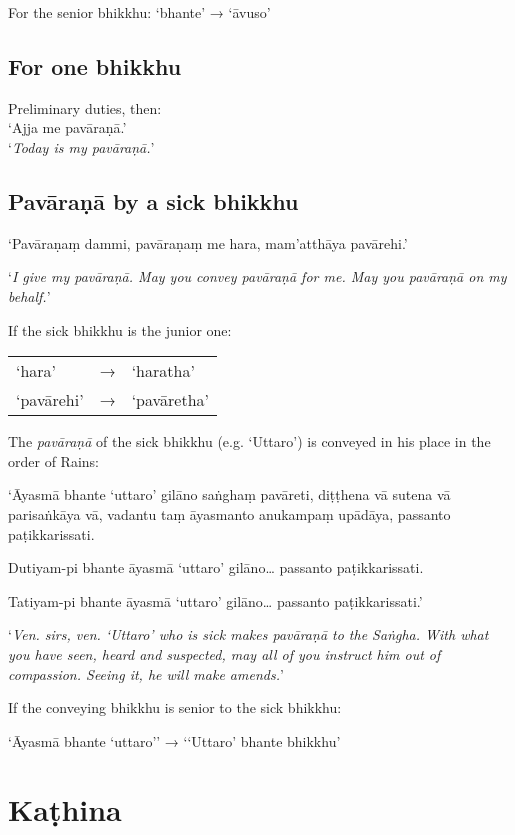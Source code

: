 For the senior bhikkhu: ‘bhante’ → ‘āvuso’


\subsection{For one bhikkhu}

Preliminary duties, then:\\
‘Ajja me pavāraṇā.’\\
‘\emph{Today is my pavāraṇā.}’ 

\subsection{Pavāraṇā by a sick bhikkhu}

‘Pavāraṇaṃ dammi, pavāraṇaṃ me hara, mam'atthāya pavārehi.’

‘\emph{I give my pavāraṇā. May you convey pavāraṇā for me. May you pavāraṇā on
  my behalf.}’


If the sick bhikkhu is the junior one:

\begin{tabular}{@{}lll@{}}
‘hara’ & → & ‘haratha’\\
‘pavārehi’ & → & ‘pavāretha’\\
\end{tabular}

The \emph{pavāraṇā} of the sick bhikkhu (e.g. ‘Uttaro’) is conveyed in his place
in the order of Rains:

‘Āyasmā bhante ‘uttaro’ gilāno saṅghaṃ pavāreti, diṭṭhena vā sutena vā
parisaṅkāya vā, vadantu taṃ āyasmanto anukampaṃ upādāya, passanto
paṭikkarissati.

Dutiyam-pi bhante āyasmā ‘uttaro’ gilāno… passanto paṭikkarissati.

Tatiyam-pi bhante āyasmā ‘uttaro’ gilāno… passanto paṭikkarissati.’

‘\emph{Ven. sirs, ven. ‘Uttaro’ who is sick makes pavāraṇā to the Saṅgha. With
  what you have seen, heard and suspected, may all of you instruct him out of
  compassion. Seeing it, he will make amends.}’

If the conveying bhikkhu is senior to the sick bhikkhu:

‘Āyasmā bhante ‘uttaro’’ → ‘‘Uttaro’ bhante bhikkhu’


\section{Kaṭhina}

